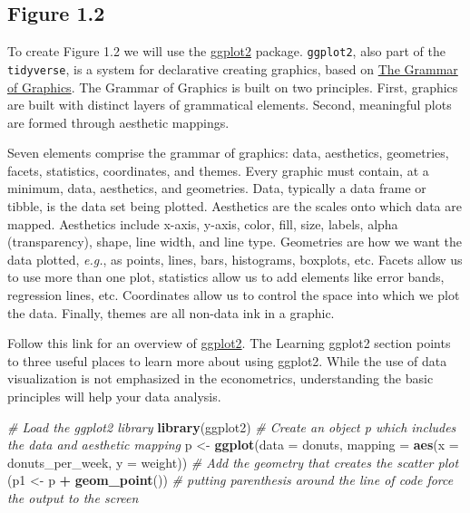 \documentclass[]{book}
\newenvironment{Shaded}{\begin{snugshade}}{\end{snugshade}}
\newcommand{\CommentTok}[1]{\textcolor[rgb]{0.56,0.35,0.01}{\textit{#1}}}
\newcommand{\DataTypeTok}[1]{\textcolor[rgb]{0.13,0.29,0.53}{#1}}
\newcommand{\KeywordTok}[1]{\textcolor[rgb]{0.13,0.29,0.53}{\textbf{#1}}}
\newcommand{\NormalTok}[1]{#1}
\newcommand{\OperatorTok}[1]{\textcolor[rgb]{0.81,0.36,0.00}{\textbf{#1}}}
\newcommand{\StringTok}[1]{\textcolor[rgb]{0.31,0.60,0.02}{#1}}
\begin{document}
\hypertarget{figure-1.2}{%
\subsection{Figure 1.2}\label{figure-1.2}}

To create Figure 1.2 we will use the \href{https://ggplot2.tidyverse.org/}{ggplot2} package. \texttt{ggplot2}, also part of the \texttt{tidyverse}, is a system for declarative creating graphics, based on \href{https://www.springer.com/in/book/9780387245447}{The Grammar of Graphics}. The Grammar of Graphics is built on two principles. First, graphics are built with distinct layers of grammatical elements. Second, meaningful plots are formed through aesthetic mappings.

Seven elements comprise the grammar of graphics: data, aesthetics, geometries, facets, statistics, coordinates, and themes. Every graphic must contain, at a minimum, data, aesthetics, and geometries. Data, typically a data frame or tibble, is the data set being plotted. Aesthetics are the scales onto which data are mapped. Aesthetics include x-axis, y-axis, color, fill, size, labels, alpha (transparency), shape, line width, and line type. Geometries are how we want the data plotted, \emph{e.g.}, as points, lines, bars, histograms, boxplots, etc. Facets allow us to use more than one plot, statistics allow us to add elements like error bands, regression lines, etc. Coordinates allow us to control the space into which we plot the data. Finally, themes are all non-data ink in a graphic.

Follow this link for an overview of \href{https://ggplot2.tidyverse.org}{ggplot2}. The Learning ggplot2 section points to three useful places to learn more about using ggplot2. While the use of data visualization is not emphasized in the econometrics, understanding the basic principles will help your data analysis.

\begin{Shaded}
\begin{Highlighting}[]
\CommentTok{# Load the ggplot2 library}
\KeywordTok{library}\NormalTok{(ggplot2)}
\CommentTok{# Create an object p which includes the data and aesthetic mapping}
\NormalTok{p <-}\StringTok{ }\KeywordTok{ggplot}\NormalTok{(}\DataTypeTok{data =}\NormalTok{ donuts, }\DataTypeTok{mapping =} \KeywordTok{aes}\NormalTok{(}\DataTypeTok{x =}\NormalTok{ donuts_per_week, }\DataTypeTok{y =}\NormalTok{ weight))}
\CommentTok{# Add the geometry that creates the scatter plot}
\NormalTok{(p1 <-}\StringTok{ }\NormalTok{p }\OperatorTok{+}\StringTok{ }\KeywordTok{geom_point}\NormalTok{()) }\CommentTok{# putting parenthesis around the line of code force the output to the screen}
\end{Highlighting}
\end{Shaded}
\end{document}
